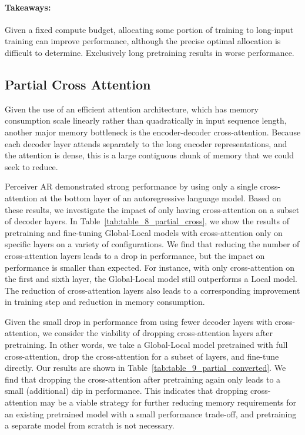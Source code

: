 \documentclass[11pt]{article}
\begin{document}
\paragraph{Takeaways:} Given a fixed compute budget, allocating some portion of training to long-input training can improve performance, although the precise optimal allocation is difficult to determine. Exclusively long pretraining results in worse performance.



\subsection{Partial Cross Attention}

Given the use of an efficient attention architecture, which has memory consumption scale linearly rather than quadratically in input sequence length, another major memory bottleneck is the encoder-decoder cross-attention.
Because each decoder layer attends separately to the long encoder representations, and the attention is dense, this is a large contiguous chunk of memory that we could seek to reduce.

Perceiver AR \citep{hawthorne2022perceiverar} demonstrated strong performance by using only a single cross-attention at the bottom layer of an autoregressive language model.
Based on these results, we investigate the impact of only having cross-attention on a subset of decoder layers. 
In Table~\ref{tab:table_8_partial_cross}, we show the results of pretraining and fine-tuning Global-Local models with cross-attention only on specific layers on a variety of configurations.
We find that reducing the number of cross-attention layers leads to a drop in performance, but the impact on performance is smaller than expected.
For instance, with only cross-attention on the first and sixth layer, the Global-Local model still outperforms a Local model.
The reduction of cross-attention layers also leads to a corresponding improvement in training step and reduction in memory consumption.

Given the small drop in performance from using fewer decoder layers with cross-attention, we consider the viability of dropping cross-attention layers after pretraining.
In other words, we take a Global-Local model pretrained with full cross-attention, drop the cross-attention for a subset of layers, and fine-tune directly.
Our results are shown in Table~\ref{tab:table_9_partial_converted}.
We find that dropping the cross-attention after pretraining again only leads to a small (additional) dip in performance.
This indicates that dropping cross-attention may be a viable strategy for further reducing memory requirements for an existing pretrained model with a small performance trade-off, and pretraining a separate model from scratch is not necessary.
\end{document}
